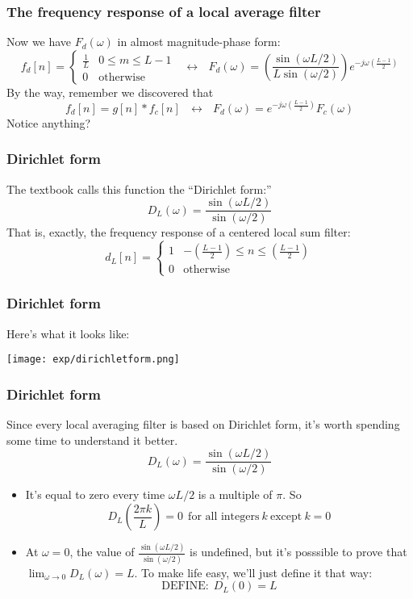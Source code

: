 \documentclass{beamer}
\begin{document}
\begin{frame}
  \frametitle{The frequency response of a local average filter}

  Now we have $F_d(\omega)$ in almost magnitude-phase form:
  \[
  f_d[n] = \begin{cases} \frac{1}{L}& 0\le m\le L-1\\
    0&\mbox{otherwise}\end{cases}~~~\leftrightarrow~~~
  F_d(\omega)=\left(\frac{\sin(\omega L/2)}{L\sin(\omega/2)}\right)e^{-j\omega\left(\frac{L-1}{2}\right)}
  \]
  By the way, remember we discovered that
  \[
  f_d[n]=g[n]\ast f_c[n]~~~\leftrightarrow~~~F_d(\omega)=e^{-j\omega\left(\frac{L-1}{2}\right)}F_c(\omega)
  \]
  Notice anything?
\end{frame}

\begin{frame}
  \frametitle{Dirichlet form}

  The textbook calls this function the ``Dirichlet form:''
  \[
  D_L(\omega) = \frac{\sin(\omega L/2)}{\sin(\omega/2)}
  \]
  That is, exactly, the frequency response of a centered local sum filter:
  \[
  d_L[n] = \begin{cases}
    1 & -\left(\frac{L-1}{2}\right)\le n\le \left(\frac{L-1}{2}\right)\\
    0 & \mbox{otherwise}
  \end{cases}
  \]
\end{frame}

\begin{frame}
  \frametitle{Dirichlet form}

  Here's what it looks like:
  \centerline{\texttt{[image: exp/dirichletform.png]}}
\end{frame}
  
\begin{frame}
  \frametitle{Dirichlet form}

  Since every local averaging filter is based on Dirichlet form, it's
  worth spending some time to understand it better.
  \[
  D_L(\omega) = \frac{\sin(\omega L/2)}{\sin(\omega/2)}
  \]
  \begin{itemize}
  \item It's equal to zero every time $\omega L/2$ is a multiple of $\pi$.  So
    \[
    D_L\left(\frac{2\pi k}{L}\right)  = 0~~\mbox{for all integers}~k~\mbox{except}~k=0
    \]
  \item At $\omega=0$, the value of $\frac{\sin(\omega
    L/2)}{\sin(\omega/2)}$ is undefined, but it's posssible to prove
    that $\lim_{\omega\rightarrow 0}D_L(\omega)=L$.  To make life
    easy, we'll just define it that way:
    \[
    \mbox{DEFINE:}~~D_L(0)=L
    \]
  \end{itemize}
\end{frame}
\end{document}
